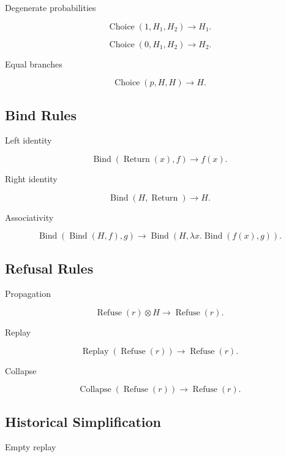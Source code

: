 \documentclass[12pt,oneside]{article}
\theoremstyle{definition}
\theoremstyle{remark}
\begin{document}
Degenerate probabilities

\[
\operatorname{Choice}
(1,H_1,H_2)
\rightarrow
H_1.
\]

\[
\operatorname{Choice}
(0,H_1,H_2)
\rightarrow
H_2.
\]

Equal branches

\[
\operatorname{Choice}
(p,H,H)
\rightarrow
H.
\]

\subsection*{Bind Rules}

Left identity

\[
\operatorname{Bind}
(
\operatorname{Return}(x),
f
)
\rightarrow
f(x).
\]

Right identity

\[
\operatorname{Bind}
(
H,
\operatorname{Return}
)
\rightarrow
H.
\]

Associativity

\[
\operatorname{Bind}
(
\operatorname{Bind}(H,f),
g
)
\rightarrow
\operatorname{Bind}
(
H,
\lambda x.
\operatorname{Bind}(f(x),g)
).
\]

\subsection*{Refusal Rules}

Propagation

\[
\operatorname{Refuse}(r)
\otimes
H
\rightarrow
\operatorname{Refuse}(r).
\]

Replay

\[
\operatorname{Replay}
(
\operatorname{Refuse}(r)
)
\rightarrow
\operatorname{Refuse}(r).
\]

Collapse

\[
\operatorname{Collapse}
(
\operatorname{Refuse}(r)
)
\rightarrow
\operatorname{Refuse}(r).
\]

\subsection*{Historical Simplification}

Empty replay
\end{document}
